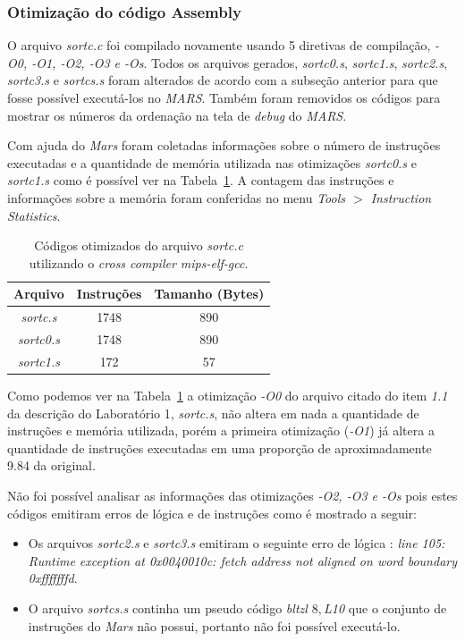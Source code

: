 \documentclass[12pt]{article}
\begin{document}
\subsubsection{Otimização do código Assembly}
\label{subsubsec:ot}

O arquivo \textit{sortc.c} foi compilado novamente usando 5 diretivas de compilação, \textit{-O0, -O1, -O2, -O3 e -Os}. Todos os arquivos gerados, \textit{sortc0.s}, \textit{sortc1.s}, \textit{sortc2.s}, \textit{sortc3.s} e \textit{sortcs.s} foram alterados de acordo com a subseção anterior para que fosse possível executá-los no \textit{MARS}. Também foram removidos os códigos para mostrar os números da ordenação na tela de \textit{debug} do \textit{MARS}.

Com ajuda do \textit{Mars} foram coletadas informações sobre o número de instruções executadas e a quantidade de memória utilizada nas otimizações \textit{sortc0.s} e \textit{sortc1.s} como é possível ver na Tabela~\ref{tab:opt}. A contagem das instruções e informações sobre a memória foram conferidas no menu \textit{Tools $>$ Instruction Statistics}.

\begin{table}[H]
	\centering
	\begin{tabular}{|c|c|c|}
		\hline
		\textbf{Arquivo} & \textbf{Instruções} & \textbf{Tamanho (Bytes)} \\\hline
		\textit{sortc.s} & 1748 & 890 \\\hline
		\textit{sortc0.s} & 1748 & 890 \\\hline
		\textit{sortc1.s} & 172 & 57 \\\hline
	\end{tabular}
	\caption{Códigos otimizados do arquivo \textit{sortc.c} utilizando o \textit{cross compiler mips-elf-gcc}.}
	\label{tab:opt}
\end{table}

Como podemos ver na Tabela~\ref{tab:opt} a otimização \textit{-O0} do arquivo citado do item \textit{1.1} da descrição do Laboratório 1, \textit{sortc.s}, não altera em nada a quantidade de instruções e memória utilizada, porém a primeira otimização (\textit{-O1}) já altera a quantidade de instruções executadas em uma proporção de aproximadamente 9.84 da original.

Não foi possível analisar as informações das otimizações \textit{-O2, -O3 e -Os} pois estes códigos emitiram erros de lógica e de instruções como é mostrado a seguir:

\begin{itemize}
	\item Os arquivos \textit{sortc2.s} e \textit{sortc3.s} emitiram o seguinte erro de lógica : \textit{line 105: Runtime exception at 0x0040010c: fetch address not aligned on word boundary 0xfffffffd}.
	\item O arquivo \textit{sortcs.s} continha um pseudo código \textit{bltzl $8,$L10} que o conjunto de instruções do \textit{Mars} não possui, portanto não foi possível executá-lo.
\end{itemize}
\end{document}
